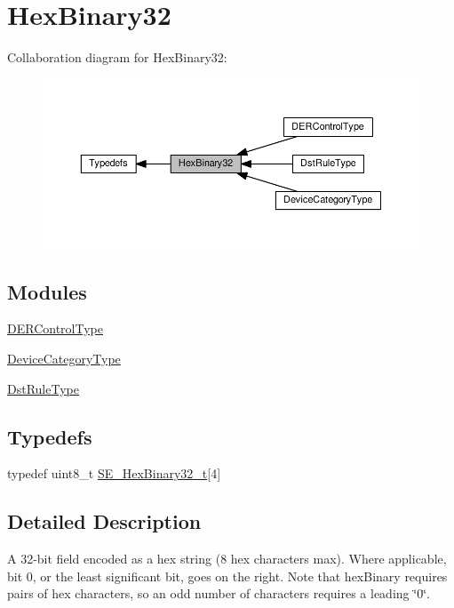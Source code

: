 \hypertarget{group__HexBinary32}{}\section{Hex\+Binary32}
\label{group__HexBinary32}
Collaboration diagram for Hex\+Binary32\+:\nopagebreak
\begin{figure}[H]
\begin{center}
\leavevmode
\includegraphics[width=350pt]{group__HexBinary32}
\end{center}
\end{figure}
\subsection*{Modules}
\begin{DoxyCompactItemize}
\item 
\hyperlink{group__DERControlType}{D\+E\+R\+Control\+Type}
\item 
\hyperlink{group__DeviceCategoryType}{Device\+Category\+Type}
\item 
\hyperlink{group__DstRuleType}{Dst\+Rule\+Type}
\end{DoxyCompactItemize}
\subsection*{Typedefs}
\begin{DoxyCompactItemize}
\item 
typedef uint8\+\_\+t \hyperlink{group__HexBinary32_ga062e99a233c4875284116657d048bb98}{S\+E\+\_\+\+Hex\+Binary32\+\_\+t}\mbox{[}4\mbox{]}
\end{DoxyCompactItemize}


\subsection{Detailed Description}
A 32-\/bit field encoded as a hex string (8 hex characters max). Where applicable, bit 0, or the least significant bit, goes on the right. Note that hex\+Binary requires pairs of hex characters, so an odd number of characters requires a leading \char`\"{}0\char`\"{}. 

